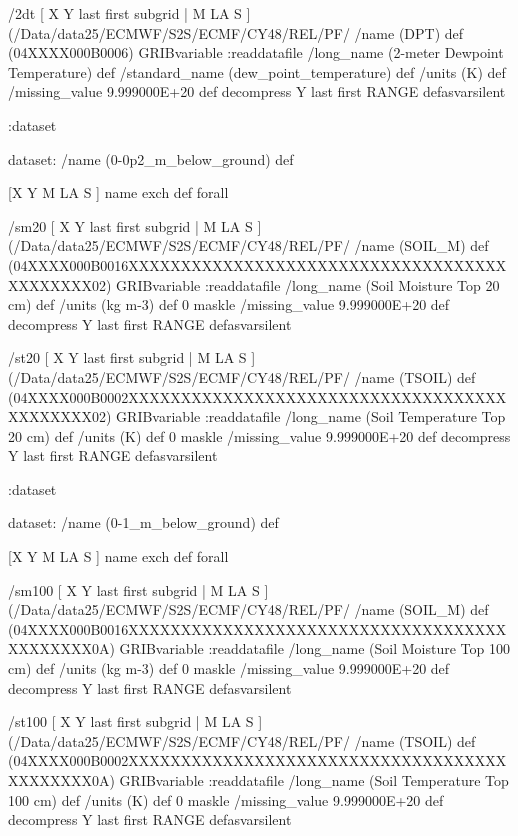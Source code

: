 \begin{ingrid}
/2dt { [ X Y last first subgrid | M LA S ] (/Data/data25/ECMWF/S2S/ECMF/CY48/REL/PF/%
/name (DPT) def
(04XXXX000B0006) GRIBvariable
:readdatafile
/long_name (2-meter Dewpoint Temperature) def
/standard_name (dew_point_temperature) def
/units (K) def
/missing_value 9.999000E+20 def
decompress
Y last first RANGE
} defasvarsilent

:dataset

dataset:
/name (0-0p2_m_below_ground) def

[X Y M LA S ] {name exch def } forall

/sm20 { [ X Y last first subgrid | M LA S ] (/Data/data25/ECMWF/S2S/ECMF/CY48/REL/PF/%
/name (SOIL_M) def
(04XXXX000B0016XXXXXXXXXXXXXXXXXXXXXXXXXXXXXXXXXXXXXXXXXXXX02) GRIBvariable
:readdatafile
/long_name (Soil Moisture Top 20 cm) def
/units (kg m-3) def
0 maskle
/missing_value 9.999000E+20 def
decompress
Y last first RANGE
} defasvarsilent


/st20 { [ X Y last first subgrid | M LA S ] (/Data/data25/ECMWF/S2S/ECMF/CY48/REL/PF/%
/name (TSOIL) def
(04XXXX000B0002XXXXXXXXXXXXXXXXXXXXXXXXXXXXXXXXXXXXXXXXXXXX02) GRIBvariable
:readdatafile
/long_name (Soil Temperature Top 20 cm) def
/units (K) def
0 maskle
/missing_value 9.999000E+20 def
decompress
Y last first RANGE
} defasvarsilent

:dataset

dataset:
/name (0-1_m_below_ground) def

[X Y M LA S ] {name exch def } forall

/sm100 { [ X Y last first subgrid | M LA S ] (/Data/data25/ECMWF/S2S/ECMF/CY48/REL/PF/%
/name (SOIL_M) def
(04XXXX000B0016XXXXXXXXXXXXXXXXXXXXXXXXXXXXXXXXXXXXXXXXXXXX0A) GRIBvariable
:readdatafile
/long_name (Soil Moisture Top 100 cm) def
/units (kg m-3) def
0 maskle
/missing_value 9.999000E+20 def
decompress
Y last first RANGE
} defasvarsilent


/st100 { [ X Y last first subgrid | M LA S ] (/Data/data25/ECMWF/S2S/ECMF/CY48/REL/PF/%
/name (TSOIL) def
(04XXXX000B0002XXXXXXXXXXXXXXXXXXXXXXXXXXXXXXXXXXXXXXXXXXXX0A) GRIBvariable
:readdatafile
/long_name (Soil Temperature Top 100 cm) def
/units (K) def
0 maskle
/missing_value 9.999000E+20 def
decompress
Y last first RANGE
} defasvarsilent


\end{ingrid}
